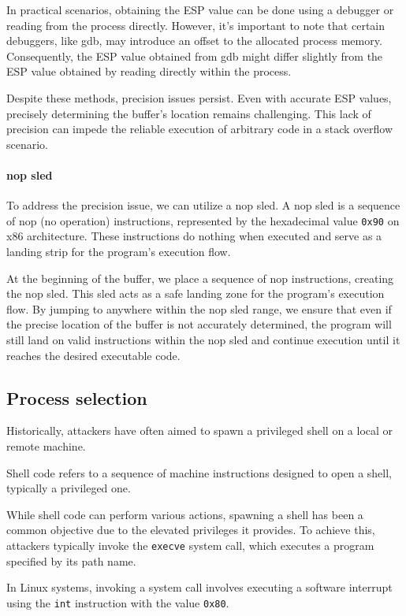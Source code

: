 In practical scenarios, obtaining the ESP value can be done using a debugger or reading from the process directly. 
However, it's important to note that certain debuggers, like gdb, may introduce an offset to the allocated process memory. 
Consequently, the ESP value obtained from gdb might differ slightly from the ESP value obtained by reading directly within the process.

Despite these methods, precision issues persist. Even with accurate ESP values, precisely determining the buffer's location remains challenging. 
This lack of precision can impede the reliable execution of arbitrary code in a stack overflow scenario.

\paragraph*{nop sled}
To address the precision issue, we can utilize a nop sled. A nop sled is a sequence of nop (no operation) instructions, represented by the hexadecimal value \texttt{0x90} on x86 architecture.
These instructions do nothing when executed and serve as a landing strip for the program's execution flow.

At the beginning of the buffer, we place a sequence of nop instructions, creating the nop sled. 
This sled acts as a safe landing zone for the program's execution flow. 
By jumping to anywhere within the nop sled range, we ensure that even if the precise location of the buffer is not accurately determined, the program will still land on valid instructions within the nop sled and continue execution until it reaches the desired executable code.

\subsection{Process selection}
Historically, attackers have often aimed to spawn a privileged shell on a local or remote machine.
\begin{definition}
    Shell code refers to a sequence of machine instructions designed to open a shell, typically a privileged one.
\end{definition}
While shell code can perform various actions, spawning a shell has been a common objective due to the elevated privileges it provides.
To achieve this, attackers typically invoke the \texttt{execve} system call, which executes a program specified by its path name.

In Linux systems, invoking a system call involves executing a software interrupt using the \texttt{int} instruction with the value \texttt{0x80}. 

